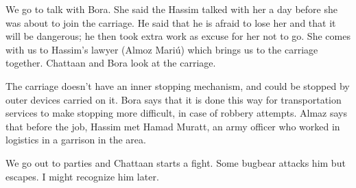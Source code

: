 \documentclass[10pt,a4paper,twoside,openany,hidelinks]{book}
\begin{document}
We go to talk with Bora. She said the Hassim talked with her a day before she was about to join the carriage. He said that he is afraid to lose her and that it will be dangerous; he then took extra work as excuse for her not to go.
She comes with us to Hassim's lawyer (Almoz Mariú) which brings us to the carriage together. Chattaan and Bora look at the carriage.

The carriage doesn't have an inner stopping mechanism, and could be stopped by outer devices carried on it. Bora says that it is done this way for transportation services to make stopping more difficult, in case of robbery attempts.
Almaz says that before the job, Hassim met Hamad Muratt, an army officer who worked in logistics in a garrison in the area.

We go out to parties and Chattaan starts a fight. Some bugbear attacks him but escapes. I might recognize him later.

\backmatter
\end{document}
